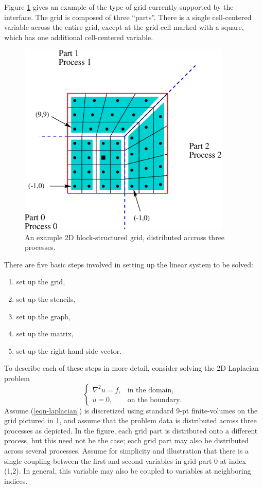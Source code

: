 Figure \ref{fig-block-structured-grid} gives an example of the type of
grid currently supported by the  interface.  The grid is
composed of three ``parts''.  There is a single cell-centered variable
across the entire grid, except at the grid cell marked with a square,
which has one additional cell-centered variable.
\begin{figure}[t]
\centering
\includegraphics[width=4in]{block_structured.eps}
\caption{%
An example 2D block-structured grid, distributed accross three processes.}
\label{fig-block-structured-grid}
\end{figure}
There are five basic steps involved in setting up the linear system to
be solved:
\begin{enumerate}
\item set up the grid,
\item set up the stencils,
\item set up the graph,
\item set up the matrix,
\item set up the right-hand-side vector.
\end{enumerate}
To describe each of these steps in more detail, consider solving the
2D Laplacian problem
\begin{equation}\label{sstruct:eqn-laplacian}
\left \{
\begin{array}{ll}
\nabla^2 u = f , & \mbox{in the domain}, \\
u = 0,           & \mbox{on the boundary}.
\end{array}
\right .
\end{equation}
Assume (\ref{eqn-laplacian}) is discretized using standard 9-pt
finite-volumes on the grid pictured in
\ref{fig-block-structured-grid}, and assume that the problem data is
distributed across three processes as depicted.  In the figure, each
grid part is distributed onto a different process, but this need not
be the case; each grid part may also be distributed across several
processes.  Assume for simplicity and illustration that there is a
single coupling between the first and second variables in grid part 0
at index (1,2).  In general, this variable may also be coupled to
variables at neighboring indices.

